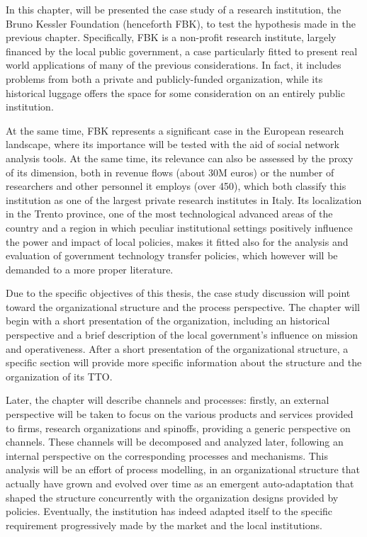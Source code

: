 

\label{Chapter7}

In this chapter, will be presented the case study of a research institution, the Bruno Kessler Foundation (henceforth FBK), to test the hypothesis made in the previous chapter. Specifically, FBK is a non-profit research institute, largely financed by the local public government, a case particularly fitted to present real world applications of many of the previous considerations. In fact, it includes problems from both a private and publicly-funded organization, while its historical luggage offers the space for some consideration on an entirely public institution. 

At the same time, FBK represents a significant case in the European research landscape, where its importance will be tested with the aid of social network analysis tools. At the same time, its relevance can also be assessed by the proxy of its dimension, both in revenue flows (about 30M euros) or the number of researchers and other personnel it employs (over 450), which both classify this institution as one of the largest private research institutes in Italy. Its localization in the Trento province, one of the most technological advanced areas of the country and a region in which peculiar institutional settings positively influence the power and impact of local policies, makes it fitted also for the analysis and evaluation of government technology transfer policies, which however will be demanded to a more proper literature.

Due to the specific objectives of this thesis, the case study discussion will point toward the organizational structure and the process perspective. The chapter will begin with a short presentation of the organization, including an historical perspective and a brief description of the local government's influence on mission and operativeness. After a short presentation of the organizational structure, a specific section will provide more specific information about the structure and the organization of its TTO.

Later, the chapter will describe channels and processes: firstly, an external perspective will be taken to focus on the various products and services provided to firms, research organizations and spinoffs, providing a generic perspective on channels. These channels will be decomposed and analyzed later, following an internal perspective on the corresponding processes and mechanisms. This analysis will be an effort of process modelling, in an organizational structure that actually have grown and evolved over time as an emergent auto-adaptation that shaped the structure concurrently with the organization designs provided by policies. Eventually, the institution has indeed adapted itself to the specific requirement progressively made by the market and the local institutions. 


